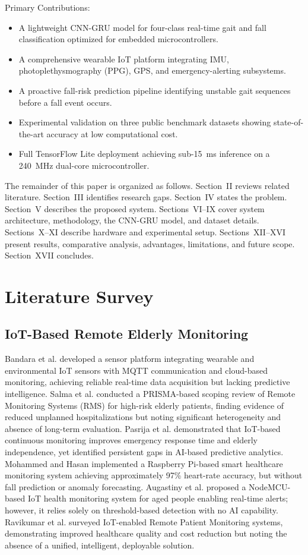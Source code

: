 \documentclass[conference]{IEEEtran}
\begin{document}
Primary Contributions:
\begin{itemize}
    \item A lightweight CNN-GRU model for four-class real-time gait and fall classification optimized for embedded microcontrollers.
    \item A comprehensive wearable IoT platform integrating IMU, photoplethysmography (PPG), GPS, and emergency-alerting subsystems.
    \item A proactive fall-risk prediction pipeline identifying unstable gait sequences before a fall event occurs.
    \item Experimental validation on three public benchmark datasets showing state-of-the-art accuracy at low computational cost.
    \item Full TensorFlow Lite deployment achieving sub-15~ms inference on a 240~MHz dual-core microcontroller.
\end{itemize}

The remainder of this paper is organized as follows. Section~II reviews related literature. Section~III identifies research gaps. Section~IV states the problem. Section~V describes the proposed system. Sections~VI--IX cover system architecture, methodology, the CNN-GRU model, and dataset details. Sections~X--XI describe hardware and experimental setup. Sections~XII--XVI present results, comparative analysis, advantages, limitations, and future scope. Section~XVII concludes.

\section{Literature Survey}

\subsection{IoT-Based Remote Elderly Monitoring}

Bandara et al. \cite{b7} developed a sensor platform integrating wearable and environmental IoT sensors with MQTT communication and cloud-based monitoring, achieving reliable real-time data acquisition but lacking predictive intelligence. Salma et al. \cite{b8} conducted a PRISMA-based scoping review of Remote Monitoring Systems (RMS) for high-risk elderly patients, finding evidence of reduced unplanned hospitalizations but noting significant heterogeneity and absence of long-term evaluation. Pasrija et al. \cite{b9} demonstrated that IoT-based continuous monitoring improves emergency response time and elderly independence, yet identified persistent gaps in AI-based predictive analytics. Mohammed and Hasan \cite{b10} implemented a Raspberry Pi-based smart healthcare monitoring system achieving approximately 97\% heart-rate accuracy, but without fall prediction or anomaly forecasting. Augastiny et al. \cite{b23} proposed a NodeMCU-based IoT health monitoring system for aged people enabling real-time alerts; however, it relies solely on threshold-based detection with no AI capability. Ravikumar et al. \cite{b24} surveyed IoT-enabled Remote Patient Monitoring systems, demonstrating improved healthcare quality and cost reduction but noting the absence of a unified, intelligent, deployable solution.
\end{document}
